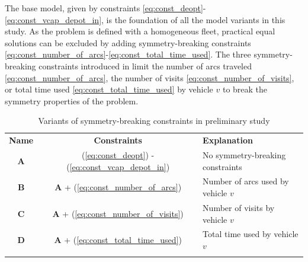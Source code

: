 The base model, given by constraints \eqref{eq:const_deopt}-\eqref{eq:const_vcap_depot_in}, is the foundation of all the model variants in this study. As the problem is defined with a homogeneous fleet, practical equal solutions can be excluded by adding symmetry-breaking constraints \eqref{eq:const_number_of_arcs}-\eqref{eq:const_total_time_used}. The three symmetry-breaking constraints introduced in  limit the number of arcs traveled \eqref{eq:const_number_of_arcs}, the number of visits \eqref{eq:const_number_of_visits}, or total time used \eqref{eq:const_total_time_used} by vehicle $v$ to break the symmetry properties of the problem. 
\\
\begin{table}[H]
    \centering
    \caption{Variants of symmetry-breaking constraints in preliminary study}
    \begin{tabular}{c c l}
        \thickhline
        \textbf{Name} & \textbf{Constraints} & \textbf{Explanation}\\
        \thickhline
        \textbf{A} & (\ref{eq:const_deopt}) - (\ref{eq:const_vcap_depot_in}) & No symmetry-breaking constraints\\
        \textbf{B} & \textbf{A} + (\ref{eq:const_number_of_arcs}) & Number of arcs used by vehicle $v$ \\
        \textbf{C} & \textbf{A} + (\ref{eq:const_number_of_visits}) & Number of visits by vehicle $v$\\
        \textbf{D} & \textbf{A} + (\ref{eq:const_total_time_used}) & Total time used by vehicle $v$\\
        \thickhline
        \end{tabular}
    \label{variants_symmetry_preliminary}
\end{table}


